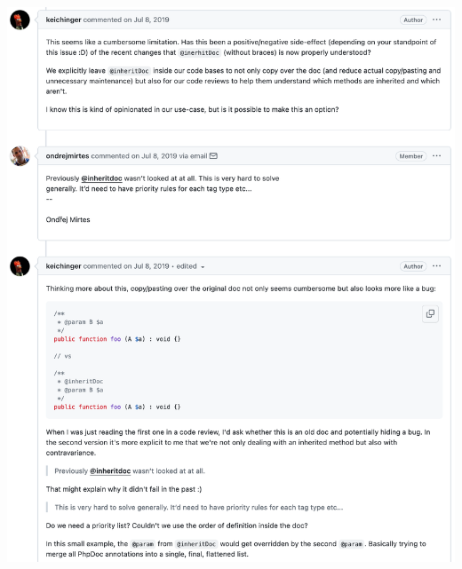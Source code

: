 \Continuing
\begin{center}
    \includegraphics[width=37em]{issue-2281-full-p2}
\end{center}
\WillContinue
\pagebreak

